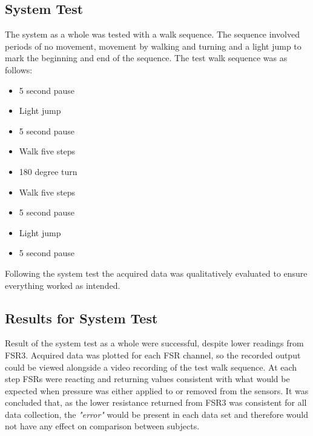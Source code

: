 \subsection{System Test}
The system as a whole was tested with a walk sequence. The sequence involved periods of no movement, movement by walking and turning and a light jump to mark the beginning and end of the sequence. The test walk sequence was as follows:
\vspace{-0.6cm}
\begin{itemize}
	\item 5 second pause
	\vspace{-0.3cm}
	\item Light jump
	\vspace{-0.3cm}
	\item 5 second pause
	\vspace{-0.3cm}
	\item Walk five steps
	\vspace{-0.3cm}
	\item 180 degree turn
	\vspace{-0.3cm}
	\item Walk five steps
	\vspace{-0.3cm}
	\item 5 second pause
	\vspace{-0.3cm}
	\item Light jump
	\vspace{-0.3cm}
	\item 5 second pause
\end{itemize}
\vspace{-0.4cm}
Following the system test the acquired data was qualitatively evaluated to ensure everything worked as intended. 

\subsection{Results for System Test}
Result of the system test as a whole were successful, despite lower readings from FSR3. Acquired data was plotted for each FSR channel, so the recorded output could be viewed alongside a video recording of the test walk sequence. At each step FSRs were reacting and returning values consistent with what would be expected when pressure was either applied to or removed from the sensors. 
It was concluded that, as the lower resistance returned from FSR3 was consistent for all data collection, the \textit{"error"} would be present in each data set and therefore would not have any effect on comparison between subjects. 

